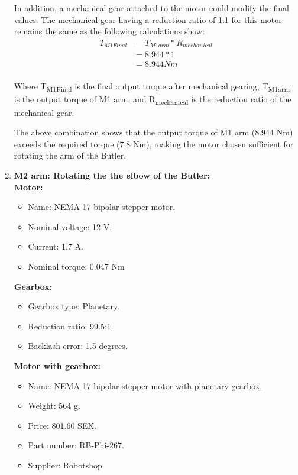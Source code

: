 \begin{enumerate}
    In addition, a mechanical gear attached to the motor could modify the final values. The mechanical gear having a reduction ratio of 1:1 for this motor remains the same as the following calculations show:
    \begin{equation} \label{eq: T_M1Final}
    \begin{split}
    T_{M1Final} & = T_{M1arm} * R_{mechanical}\\
    & =  8.944 * 1\\
    & = 8.944 Nm\\
    \end{split}
    \end{equation}
    
    Where T\textsubscript{M1Final} is the final output torque after mechanical gearing, T\textsubscript{M1arm} is the output torque of M1 arm, and R\textsubscript{mechanical} is the reduction ratio of the mechanical gear.
    
    The above combination shows that the output torque of M1 arm (8.944 Nm) exceeds the required torque (7.8 Nm), making the motor chosen sufficient for rotating the arm of the Butler.\\
   
    \item \textbf {M2 arm: Rotating the the elbow of the Butler:}\\
    \textbf{Motor:}
    \begin{itemize}
        \item Name: NEMA-17 bipolar stepper motor\cite{M2andM5}.
        \item Nominal voltage: 12 V.
        \item Current: 1.7 A.
        \item Nominal torque: 0.047 Nm\\
       
    \end{itemize}
    
    \textbf{Gearbox:}
    \begin{itemize}
        \item Gearbox type: Planetary.
        \item Reduction ratio: 99.5:1.
        \item Backlash error: 1.5 degrees.\\
    \end{itemize}
    
     \textbf{Motor with gearbox:}
    \begin{itemize}
        \item Name: NEMA-17 bipolar stepper motor with planetary gearbox.
        \item Weight: 564 g.
        \item Price: 801.60 SEK.
        \item Part number: RB-Phi-267.
        \item Supplier: Robotshop.
    \end{itemize}
    

\end{enumerate}
